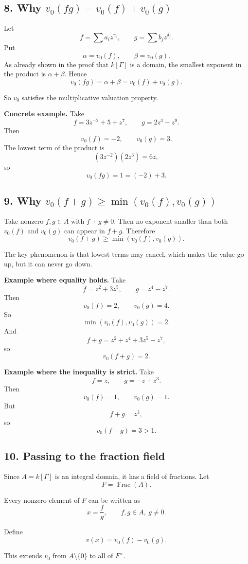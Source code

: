 \documentclass[12pt,a4paper]{article}
\theoremstyle{notespace}
\DeclareMathOperator{\Frac}{Frac}
\begin{document}
\subsection{8. Why \(v_0(fg)=v_0(f)+v_0(g)\)}

Let
\[
f=\sum a_i z^{\gamma_i},
\qquad
g=\sum b_j z^{\delta_j}.
\]
Put
\[
\alpha=v_0(f),
\qquad
\beta=v_0(g).
\]
As already shown in the proof that \(k[\Gamma]\) is a domain, the smallest exponent in the product is \(\alpha+\beta\). Hence
\[
v_0(fg)=\alpha+\beta=v_0(f)+v_0(g).
\]

So \(v_0\) satisfies the multiplicative valuation property.

\textbf{Concrete example.}
Take
\[
f=3z^{-2}+5+z^7,
\qquad
g=2z^3-z^9.
\]
Then
\[
v_0(f)=-2,
\qquad
v_0(g)=3.
\]
The lowest term of the product is
\[
(3z^{-2})(2z^3)=6z,
\]
so
\[
v_0(fg)=1=(-2)+3.
\]

\subsection{9. Why \(v_0(f+g)\ge \min(v_0(f),v_0(g))\)}

Take nonzero \(f,g\in A\) with \(f+g\neq 0\). Then no exponent smaller than both \(v_0(f)\) and \(v_0(g)\) can appear in \(f+g\). Therefore
\[
v_0(f+g)\ge \min(v_0(f),v_0(g)).
\]

The key phenomenon is that lowest terms may cancel, which makes the value go up, but it can never go down.

\textbf{Example where equality holds.}
Take
\[
f=z^2+3z^5,
\qquad
g=z^4-z^7.
\]
Then
\[
v_0(f)=2,
\qquad
v_0(g)=4.
\]
So
\[
\min(v_0(f),v_0(g))=2.
\]
And
\[
f+g=z^2+z^4+3z^5-z^7,
\]
so
\[
v_0(f+g)=2.
\]

\textbf{Example where the inequality is strict.}
Take
\[
f=z,
\qquad
g=-z+z^3.
\]
Then
\[
v_0(f)=1,
\qquad
v_0(g)=1.
\]
But
\[
f+g=z^3,
\]
so
\[
v_0(f+g)=3>1.
\]

\subsection{10. Passing to the fraction field}

Since \(A=k[\Gamma]\) is an integral domain, it has a field of fractions. Let
\[
F=\Frac(A).
\]

Every nonzero element of \(F\) can be written as
\[
x=\frac{f}{g},
\qquad
f,g\in A,\ g\neq 0.
\]

Define
\[
v(x)=v_0(f)-v_0(g).
\]

This extends \(v_0\) from \(A\setminus\{0\}\) to all of \(F^\times\).
\end{document}
